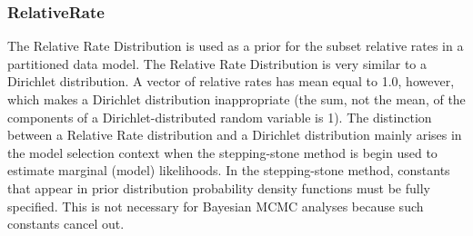 \documentclass[10pt]{article}
\begin{document}
\subsubsection{RelativeRate}

The Relative Rate Distribution is used as a prior for the subset relative rates in a partitioned data model. The Relative Rate Distribution is very similar to a Dirichlet distribution. A vector of relative rates has mean equal to 1.0, however, which makes a Dirichlet distribution inappropriate (the sum, not the mean, of the components of a Dirichlet-distributed random variable is 1). The distinction between a Relative Rate distribution and a Dirichlet distribution mainly arises in the model selection context when the stepping-stone method is begin used to estimate marginal (model) likelihoods. In the stepping-stone method, constants that appear in prior distribution probability density functions must be fully specified. This is not necessary for Bayesian MCMC analyses because such constants cancel out.
\end{document}
